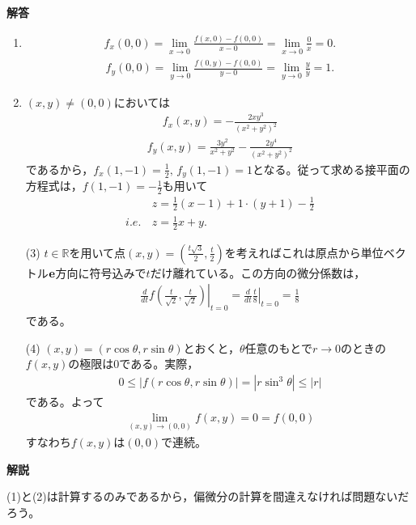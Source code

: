 \documentclass[a4paper,12pt,dvipdfmx,fleqn, oneside]{jsarticle}
\theoremstyle{defstyle}
\theoremstyle{thmx}
\theoremstyle{qesstyle}
\begin{document}
\begin{screen}
    \textbf{解答}

    \begin{enumerate}
        \item \begin{align*}
                  f_x(0,0)
                  = \lim_{x \to 0}\frac{f(x,0)-f(0,0)}{x-0}
                  = \lim_{x \to 0}\frac{0}{x}=0.
              \end{align*}
              \begin{align*}
                  f_y(0,0)
                  = \lim_{y \to 0}\frac{f(0,y)-f(0,0)}{y-0}
                  = \lim_{y \to 0}\frac{y}{y} = 1.
              \end{align*}
        \item $(x,y) \neq (0,0)$においては
              \begin{align*}
                  f_x(x,y)=-\frac{2xy^3}{(x^2+y^2)^2}
              \end{align*}
              \begin{align*}
                  f_y(x,y)=\frac{3y^2}{x^2+y^2}-\frac{2y^4}{(x^2+y^2)^2}
              \end{align*}
              であるから，$f_x(1,-1)=\frac{1}{2},\, f_y(1,-1)=1$となる。従って求める接平面の方程式は，$f(1,-1)=-\frac{1}{2}$も用いて
              \begin{align*}
                          & z = \frac{1}{2}(x-1)+1\cdot (y+1)-\frac{1}{2} \\
                  i.e. \, & z = \frac{1}{2}x +y.
              \end{align*}
    \end{enumerate}
\end{screen}
\begin{screen}
    \begin{enumerate}
        \item[(3)] $t \in \mathbb{R}$を用いて点$(x,y)=\left(\frac{t\sqrt{3}}{2},\frac{t}{2}\right)$を考えればこれは原点から単位ベクトル$\bf{e}$方向に符号込みで$t$だけ離れている。この方向の微分係数は，
            \begin{align*}
                \left. \frac{d}{dt} f\left(\frac{t}{\sqrt{2}},\frac{t}{\sqrt{2}}\right)\right|_{t=0} =\left. \frac{d}{dt} \frac{t}{8} \right|_{t=0} = \frac{1}{8}
            \end{align*}
            である。
        \item[(4)] $(x,y)=(r\cos \theta, r\sin \theta)$とおくと，$\theta$任意のもとで$r \to 0$のときの$f(x,y)$の極限は$0$である。実際，
            \begin{align*}
                0 \leq |f(r\cos \theta , r\sin \theta)|= |r \sin^3 \theta| \leq |r|
            \end{align*}
            である。よって
            \begin{align*}
                \lim_{(x,y)\to (0,0)}f(x,y) = 0 =f(0,0)
            \end{align*}
            すなわち$f(x,y)$は$(0,0)$で連続。
    \end{enumerate}
\end{screen}

\textbf{解説}

(1)と(2)は計算するのみであるから，偏微分の計算を間違えなければ問題ないだろう。
\end{document}

